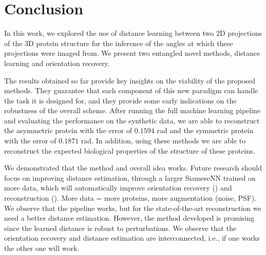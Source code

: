 \section{Conclusion}

 In this work, we explored the use of distance learning between two 2D projections of the 3D protein structure for the inference of the angles at which these projections were imaged from.
We present two entangled novel methods, distance learning and orientation recovery.

The results obtained so far provide key insights on the viability of the proposed methods.
They guarantee that each component of this new paradigm can handle the task it is designed for, and they provide some early indications on the robustness of the overall scheme.
After running the full machine learning pipeline and evaluating the performance on the synthetic data, we are able to reconstruct the asymmetric protein with the error of $0.1594$ rad and the symmetric protein with the error of $0.1871$ rad.
In addition, using these methods we are able to reconstruct the expected biological properties of the structure of these proteins.

We demonstrated that the method and overall idea works. Future research should focus on improving distance estimation, through a larger SiameseNN trained on more data, which will automatically improve orientation recovery () and reconstruction ().
More data = more proteins, more augmentation (noise, PSF).
We observe that the pipeline works, but for the state-of-the-art reconstruction we need a better distance estimation.
However, the method developed is promising since the learned distance is robust to perturbations.
We observe that the orientation recovery and distance estimation are interconnected, i.e., if one works the other one will work.



